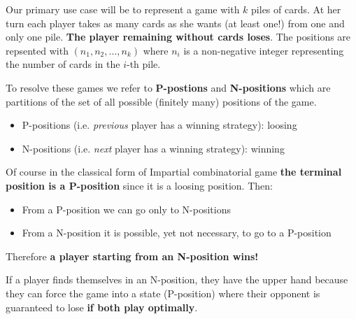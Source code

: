 \documentclass[../main.tex]{subfiles}
\begin{document}
Our primary use case will be to represent a game with $k$ piles of cards. At her turn each player takes as many cards as she wants (at least one!) from one and only one pile. \textbf{The player remaining without cards loses}. The positions are repsented with $(n_1, n_2, \ldots, n_k)$ where $n_i$ is a non-negative integer representing the number of cards in the $i$-th pile.

To resolve these games we refer to \textbf{P-postions} and \textbf{N-positions} which are partitions of the set of all possible (finitely many) positions of the game.
\begin{itemize}
    \item P-positions (i.e. \textit{previous} player has a winning strategy): loosing
    \item N-positions (i.e. \textit{next} player has a winning strategy): winning
\end{itemize}

Of course in the classical form of Impartial combinatorial game \textbf{the terminal position is a P-position} since it is a loosing position. Then:
\begin{itemize}
    \item From a P-position we can go only to N-positions
    \item From a N-position it is possible, yet not necessary, to go to a P-position
\end{itemize}

\begin{center}
\end{center}

Therefore \textbf{a player starting from an N-position wins!}

If a player finds themselves in an N-position, they have the upper hand because they can force the game into a state (P-position) where their opponent is guaranteed to lose \textbf{if both play optimally}.
\end{document}
